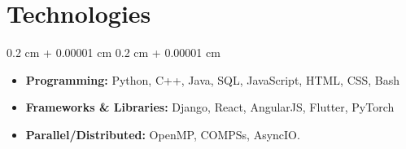 \documentclass[10pt, letterpaper]{article}
\newenvironment{highlightsforbulletentries}{
    \begin{itemize}[
        topsep=0.10 cm,
        parsep=0.10 cm,
        partopsep=0pt,
        itemsep=0pt,
        leftmargin=10pt
    ]
}{
    \end{itemize}
} %
\newenvironment{onecolentry}{
    \begin{adjustwidth}{
        0.2 cm + 0.00001 cm
    }{
        0.2 cm + 0.00001 cm
    }
}{
    \end{adjustwidth}
} %
\begin{document}
    
    \section{Technologies}
        \begin{onecolentry}
            \begin{highlightsforbulletentries}
                \item \textbf{Programming:} Python, C++, Java, SQL, JavaScript, HTML, CSS, Bash
                \item \textbf{Frameworks \& Libraries:} Django, React, AngularJS, Flutter, PyTorch
                \item \textbf{Parallel/Distributed:} OpenMP, COMPSs, AsyncIO.
            \end{highlightsforbulletentries}
        \end{onecolentry}


    
\end{document}
